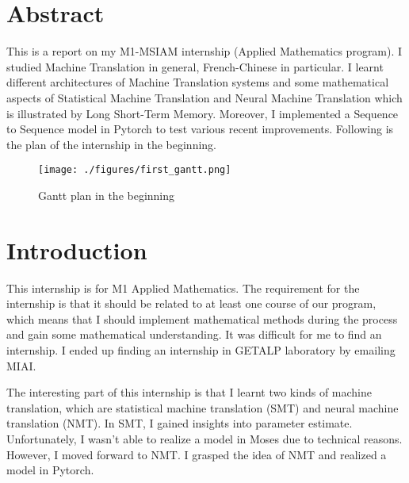 \setcounter{secnumdepth}{-1}
%
%


\section{Abstract}
\setcounter{secnumdepth}{3}
This is a report on my M1-MSIAM internship (Applied Mathematics program). I studied Machine Translation in general, French-Chinese in particular. I learnt different architectures of Machine Translation systems and some mathematical aspects of Statistical Machine Translation and Neural Machine Translation which is illustrated by Long Short-Term Memory. Moreover, I implemented a Sequence to Sequence model in Pytorch to test various recent improvements. Following is the plan of the internship in the beginning.
\begin{figure}[h]			%
	\centering
	\texttt{[image: ./figures/first\_gantt.png]}	
	\caption{Gantt plan in the beginning}
\end{figure}




\setcounter{secnumdepth}{-1}
%
%
\section{Introduction}
\setcounter{secnumdepth}{3}

This internship is for M1 Applied Mathematics. The requirement for the internship is that it should be related to at least one course of our program, which means that I should implement mathematical methods during the process and gain some mathematical understanding. It was difficult for me to find an internship. I ended up finding an internship in GETALP laboratory by emailing MIAI. 

The interesting part of this internship is that I learnt two kinds of machine translation, which are statistical machine translation (SMT) and neural machine translation (NMT). In SMT, I gained insights into parameter estimate. Unfortunately, I wasn't able to realize a model in Moses due to technical reasons. However, I moved forward to NMT. I grasped the idea of NMT and realized a model in Pytorch.

